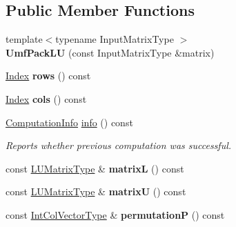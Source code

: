 \subsection*{Public Member Functions}
\begin{DoxyCompactItemize}
\item 
\mbox{\label{class_eigen_1_1_umf_pack_l_u_a3b0b5f84a7d80617dfb30346557314ee}} 
{\footnotesize template$<$typename Input\+Matrix\+Type $>$ }\\{\bfseries Umf\+Pack\+LU} (const Input\+Matrix\+Type \&matrix)
\item 
\mbox{\label{class_eigen_1_1_umf_pack_l_u_a549f558df5de7839dfba74ca9b9a2572}} 
\hyperlink{namespace_eigen_a62e77e0933482dafde8fe197d9a2cfde}{Index} {\bfseries rows} () const
\item 
\mbox{\label{class_eigen_1_1_umf_pack_l_u_aad5e5a2b1d2e450d9749ae784c3dfa16}} 
\hyperlink{namespace_eigen_a62e77e0933482dafde8fe197d9a2cfde}{Index} {\bfseries cols} () const
\item 
\hyperlink{group__enums_ga85fad7b87587764e5cf6b513a9e0ee5e}{Computation\+Info} \hyperlink{class_eigen_1_1_umf_pack_l_u_a68738a0d99c67316877706f98b033402}{info} () const
\begin{DoxyCompactList}\small\item\em Reports whether previous computation was successful. \end{DoxyCompactList}\item 
\mbox{\label{class_eigen_1_1_umf_pack_l_u_a35ae31390d7c11e9a51b573616fc65ba}} 
const \hyperlink{group___sparse_core___module}{L\+U\+Matrix\+Type} \& {\bfseries matrixL} () const
\item 
\mbox{\label{class_eigen_1_1_umf_pack_l_u_afcbe772b2cbf458791111ae5b648c21a}} 
const \hyperlink{group___sparse_core___module}{L\+U\+Matrix\+Type} \& {\bfseries matrixU} () const
\item 
\mbox{\label{class_eigen_1_1_umf_pack_l_u_aa567568176f719c536ae84bb82128aae}} 
const \hyperlink{group___core___module}{Int\+Col\+Vector\+Type} \& {\bfseries permutationP} () const
\item 

\end{DoxyCompactItemize}
